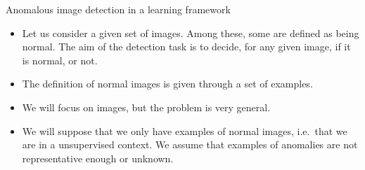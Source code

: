 \documentclass[xcolor=pdftex,dvipsnames,table,mathserif]{beamer}
\begin{document}
\begin{frame}{Anomalous image detection in a learning framework}

  \begin{block}{}
    \begin{itemize}
    \item Let us consider a given set of images. Among these, some  are defined as being \alert{normal}. The aim of the detection task is to decide, for any given image, if it is normal, or not.
    \item The definition of normal images is given through a set of examples.
    \end{itemize}
  \end{block}

  \begin{itemize}
  \item We will focus on images, but the problem is very general.
  \item We will suppose that we only have examples of normal images, i.e.\ that we are in a \alert{unsupervised} context. We assume that examples of anomalies are not representative enough or unknown.
  \end{itemize}



\end{frame}
\end{document}
